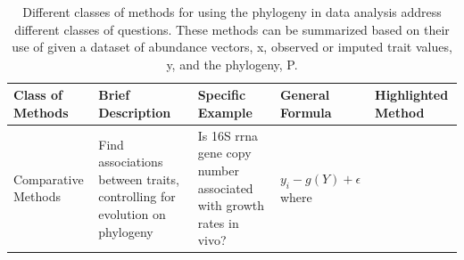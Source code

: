 \begin{table}[!ht]
        \caption[Comparison of different phylogentically aware methods.]{Different classes of methods for using the phylogeny in data analysis address different classes of questions. These methods can be summarized based on their use of given a dataset of abundance vectors, x, observed or imputed trait values, y, and the phylogeny, P. }

        \vspace{-0.25in}
        \begin{center}
                \begin{tabular}{|p{0.7in}|p{1.3in}|p{1.1in}|p{1.1in}|p{1.1in}|}
                        \hline
                        Class of Methods & Brief Description & Specific Example & General Formula & Highlighted Method \\
                        \hline
                        Comparative Methods &Find associations between traits, controlling for evolution on phylogeny & Is 16S \gls{rrna} gene copy number associated with growth rates in	vivo?& $y_{i}-g(Y)+\epsilon $
                        where


\end{tabular}
\end{center}
\end{table}
